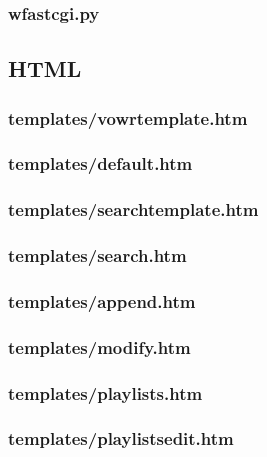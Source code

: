 \documentclass{book}
\renewcommand{\,}{\kern0.2ex}
\begin{document}
	\subsubsection{wfastcgi.py}
	
	
	\subsection{HTML}
	\subsubsection{templates/vowr\textunderscore template.htm}
	
	\subsubsection{templates/default.htm}
	
	\subsubsection{templates/search\textunderscore template.htm}
	
	\subsubsection{templates/search.htm}
	
	\subsubsection{templates/append.htm}
	
	\subsubsection{templates/modify.htm}
	
	\subsubsection{templates/playlists.htm}
	
	\subsubsection{templates/playlists\textunderscore edit.htm}
	
\end{document}

